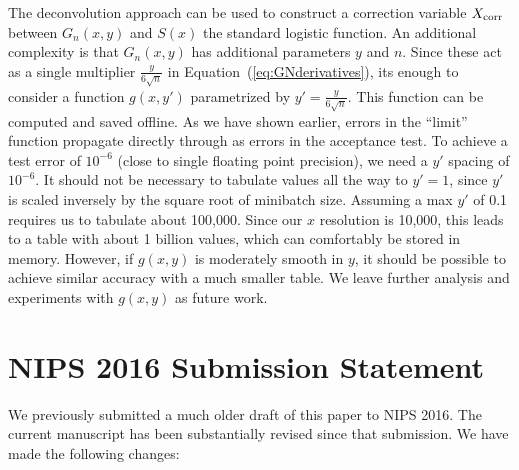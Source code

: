 \documentclass[twoside]{article} \usepackage{aistats2017}
\begin{document}
The deconvolution approach can be used to construct a correction variable
$X_{\rm corr}$ between $G_n(x,y)$ and $S(x)$ the standard logistic function. An
additional complexity is that $G_n(x,y)$ has additional parameters $y$ and $n$.
Since these act as a single multiplier $\frac{y}{6\sqrt{n}}$ in
Equation~(\ref{eq:GNderivatives}), its enough to consider a function $g(x,y')$
parametrized by $y'= \frac{y}{6\sqrt{n}}$. This function can be computed and
saved offline. As we have shown earlier, errors in the ``limit'' function
propagate directly through as errors in the acceptance test.  To achieve a test
error of $10^{-6}$ (close to single floating point precision), we need a $y'$
spacing of $10^{-6}$. It should not be necessary to tabulate values all the way to
$y'=1$, since $y'$ is scaled inversely by the square root of minibatch size.
Assuming a max $y'$ of 0.1 requires us to tabulate about 100,000.  Since our $x$
resolution is 10,000, this leads to a table with about 1 billion values, which
can comfortably be stored in memory.  However, if $g(x,y)$ is moderately smooth
in $y$, it should be possible to achieve similar accuracy with a much smaller
table. We leave further analysis and experiments with $g(x,y)$ as future work.




\clearpage
\section{NIPS 2016 Submission Statement}

We previously submitted a much older draft of this paper to NIPS 2016. The
current manuscript has been substantially revised since that submission. We have
made the following changes:
\end{document}
